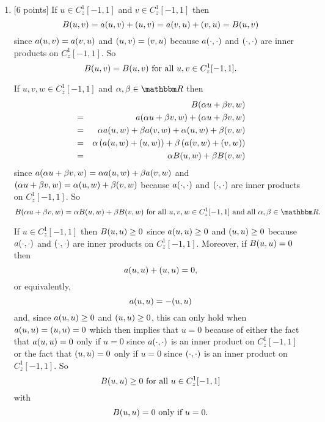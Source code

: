 \begin{solution}
\begin{enumerate}
\item {[6 points]} If $u\in C_z^1[-1,1]$ and $v\in C_z^1[-1,1]$ then
\[
B(u,v)=a(u,v)+(u,v)=a(v,u)+(v,u)=B(u,v)
\]
since $a(u,v)=a(v,u)$ and $(u,v)=(v,u)$ because $a(\cdot,\cdot)$ and $(\cdot,\cdot)$ are inner products on $C_z^1[-1,1]$. So
\[
B(u,v)=B(u,v)\mbox{ for all }u,v\in C_z^1[-1,1].
\]

If $u,v,w\in C_z^1[-1,1]$ and $\alpha,\beta\in\R$ then
\begin{eqnarray*}
&&B(\alpha u+\beta v,w)
\\
&=&a(\alpha u+\beta v,w)+(\alpha u+\beta v,w)
\\
&=&\alpha a(u,w)+\beta a(v,w)+\alpha(u,w)+\beta(v,w)
\\
&=&\alpha\left(a(u,w)+(u,w)\right)+\beta\left(a(v,w)+(v,w)\right)
\\
&=&\alpha B(u,w)+\beta B(v,w)
\end{eqnarray*}
since $a(\alpha u+\beta v,w)=\alpha a(u,w)+\beta a(v,w)$ and $(\alpha u+\beta v,w)=\alpha(u,w)+\beta(v,w)$ because $a(\cdot,\cdot)$ and $(\cdot,\cdot)$ are inner products on $C_z^1[-1,1]$. So
\[
B\ip{\alpha u+\beta v,w}=\alpha B\ip{u,w}+\beta B\ip{v,w}\mbox{ for all }u,v,w\in C_z^1[-1,1]\mbox{ and all }\alpha,\beta\in\R.
\]

If $u\in C_z^1[-1,1]$ then $B(u,u)\ge0$ since $a(u,u)\ge0$ and $(u,u)\ge0$ because $a(\cdot,\cdot)$ and $(\cdot,\cdot)$ are inner products on $C_z^1[-1,1]$. Moreover, if $B(u,u)=0$ then
\[
a(u,u)+(u,u)=0,
\]
or equivalently,
\[
a(u,u)=-(u,u)
\]
and, since $a(u,u)\ge0$ and $(u,u)\ge0$, this can only hold when $a(u,u)=(u,u)=0$ which then implies that $u=0$ because of either the fact that $a(u,u)=0$ only if $u=0$ since $a(\cdot,\cdot)$ is an inner product on $C_z^1[-1,1]$ or the fact that $(u,u)=0$ only if $u=0$ since $(\cdot,\cdot)$ is an inner product on $C_z^1[-1,1]$. So
\[
B(u,u)\ge0\mbox{ for all }u\in C_z^1[-1,1]
\]
with
\[
B(u,u)=0\mbox{ only if }u=0.
\]


\end{enumerate}
\end{solution}
